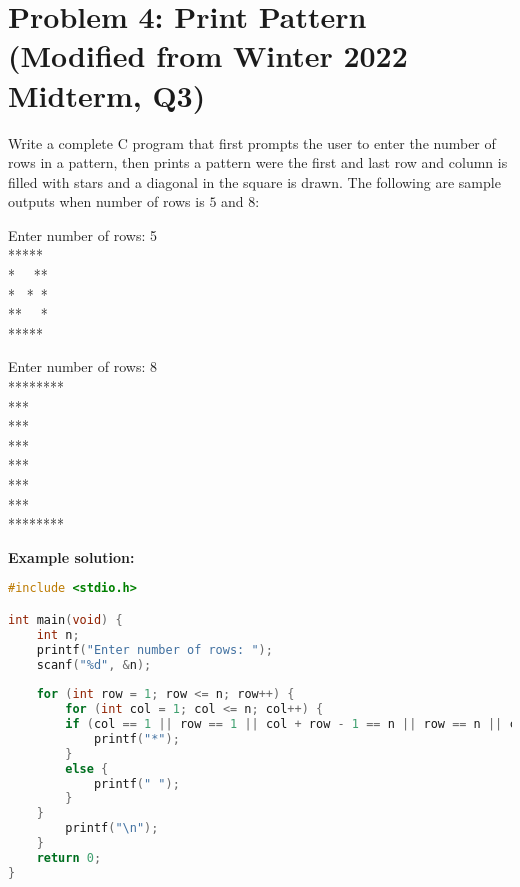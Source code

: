\documentclass[12pt]{article}
\begin{document}
\section*{Problem 4: Print Pattern (Modified from Winter 2022 Midterm, Q3)}

Write a complete C program that first prompts the user to enter the number of rows in a pattern, then prints a pattern were the first and last row and column is filled with stars and a diagonal in the square is drawn. The following are sample outputs when number of rows is $5$ and $8$:

\begin{tcolorbox}[colback=gray!10, boxrule=0pt, sharp corners, enhanced jigsaw, left=3mm, right=3mm, top=1mm, bottom=1mm]
	Enter number of rows: 5\\
	*****\\
	* \ \ **\\
	* \  *\   *\\
	** \ \  * \\
	*****\\
\end{tcolorbox}

\begin{tcolorbox}[colback=gray!10, boxrule=0pt, sharp corners, enhanced jigsaw, left=3mm, right=3mm, top=1mm, bottom=1mm]
	Enter number of rows: 8\\
	********\\
	*\phantom{*}\phantom{*}\phantom{*}\phantom{*}\phantom{*}**\\
	*\phantom{*}\phantom{*}\phantom{*}\phantom{*}*\phantom{*}*\\
	*\phantom{*}\phantom{*}\phantom{*}*\phantom{*}\phantom{*}* \\
	*\phantom{*}\phantom{*}*\phantom{*}\phantom{*}\phantom{*}*\\
	*\phantom{*}*\phantom{*}\phantom{*}\phantom{*}\phantom{*}*\\
	**\phantom{*}\phantom{*}\phantom{*}\phantom{*}\phantom{*}*\\
	********\\
\end{tcolorbox}

\textbf{Example solution:}
\begin{lstlisting}[language=C]
#include <stdio.h> 

int main(void) {
	int n;
	printf("Enter number of rows: "); 
	scanf("%d", &n);
	
	for (int row = 1; row <= n; row++) {
		for (int col = 1; col <= n; col++) {
		if (col == 1 || row == 1 || col + row - 1 == n || row == n || col ==n) {
			printf("*"); 
		} 
		else {
			printf(" ");
		}
	}
		printf("\n"); 
	}
	return 0; 
}
\end{lstlisting}
\end{document}
